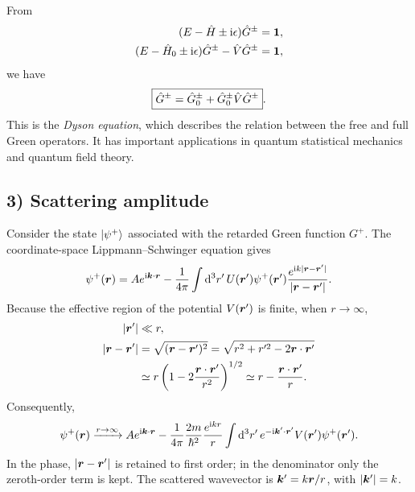 From
\begin{equation}\begin{aligned}
(E-\hat{H}\pm\mathrm{i}\epsilon)\hat{G}^\pm&=\mathbf1,\\
(E-\hat{H}_0\pm\mathrm{i}\epsilon)\hat{G}^\pm-\hat{V}\hat{G}^\pm&=\mathbf1,
\end{aligned}\end{equation}
we have
\begin{equation}
\boxed{\hat{G}^\pm=\hat{G}_0^\pm+\hat{G}_0^\pm\hat{V}\hat{G}^\pm}.
\end{equation}
This is the \emph{Dyson equation}, which describes the relation between the free and full Green operators. It has important applications in quantum statistical mechanics and quantum field theory.

\subsection*{3) Scattering amplitude}
Consider the state $\left|\psi^+\right\rangle$ associated with the retarded Green function $G^+$. The coordinate-space Lippmann--Schwinger equation gives
\begin{equation}
\psi^+(\bm{r})=A e^{\mathrm{i}\bm{k}\cdot\bm{r}}
-\frac1{4\pi}\int\mathrm{d}^3r'\,U(\bm{r}')\psi^+(\bm{r}')
\frac{e^{\mathrm{i} k|\bm{r}-\bm{r}'|}}{|\bm{r}-\bm{r}'|}.
\end{equation}
Because the effective region of the potential $V(\bm{r}')$ is finite, when $r\to\infty$,
\begin{equation}\begin{aligned}
|\bm{r}'|&\ll r,\\
|\bm{r}-\bm{r}'|&=\sqrt{(\bm{r}-\bm{r}')^2}
=\sqrt{r^2+r'^2-2\bm{r}\cdot\bm{r}'}\\
&\simeq r\left(1-2\frac{\bm{r}\cdot\bm{r}'}{r^2}\right)^{1/2}
\simeq r-\frac{\bm{r}\cdot\bm{r}'}r.
\end{aligned}\end{equation}
Consequently,
\begin{equation}
\psi^+(\bm{r})\xrightarrow{r\to\infty}
Ae^{\mathrm{i}\bm{k}\cdot\bm{r}}
-\frac1{4\pi}\frac{2m}{\hbar^2}\frac{e^{\mathrm{i} kr}}r
\int\mathrm{d}^3r'\,e^{-\mathrm{i}\bm{k}'\cdot\bm{r}'}V(\bm{r}')\psi^+(\bm{r}').
\end{equation}
In the phase, $|\bm{r}-\bm{r}'|$ is retained to first order; in the denominator only the zeroth-order term is kept. The scattered wavevector is $\bm{k}'=k\bm{r}/r$, with $|\bm{k}'|=k$.

